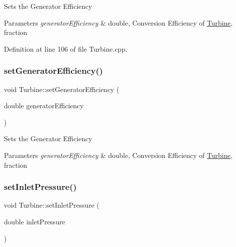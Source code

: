 Sets the Generator Efficiency


\begin{DoxyParams}{Parameters}
{\em generator\+Efficiency} & double, Conversion Efficiency of \hyperlink{class_turbine}{Turbine}, fraction \\
\hline
\end{DoxyParams}


Definition at line 106 of file Turbine.\+cpp.

\mbox{\label{class_turbine_a51e9c5050a5be51b86dc23e690bd3f40}} 
\subsubsection{\texorpdfstring{set\+Generator\+Efficiency()}{setGeneratorEfficiency()}\hspace{0.1cm}{\footnotesize\ttfamily [3/3]}}
{\footnotesize\ttfamily void Turbine\+::set\+Generator\+Efficiency (\begin{DoxyParamCaption}\item[{double}]{generator\+Efficiency }\end{DoxyParamCaption})}

Sets the Generator Efficiency


\begin{DoxyParams}{Parameters}
{\em generator\+Efficiency} & double, Conversion Efficiency of \hyperlink{class_turbine}{Turbine}, fraction \\
\hline
\end{DoxyParams}
\mbox{\label{class_turbine_a04996baab9a40d449a69c737c00be8e4}} 
\subsubsection{\texorpdfstring{set\+Inlet\+Pressure()}{setInletPressure()}\hspace{0.1cm}{\footnotesize\ttfamily [1/3]}}
{\footnotesize\ttfamily void Turbine\+::set\+Inlet\+Pressure (\begin{DoxyParamCaption}\item[{double}]{inlet\+Pressure }\end{DoxyParamCaption})}


